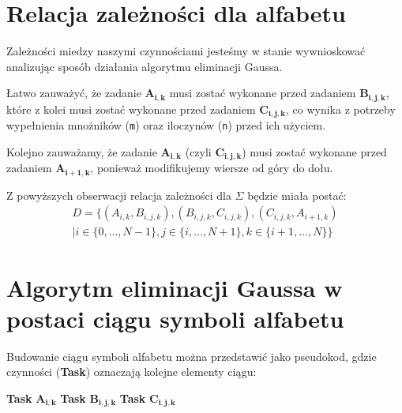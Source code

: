 \documentclass{article}
\begin{document}
\section{Relacja zależności dla alfabetu}
Zależności miedzy naszymi czynnościami jesteśmy w stanie wywnioskować analizując
sposób działania algorytmu eliminacji Gaussa.

Łatwo zauważyć, że zadanie $\mathbf{A_{i,k}}$ musi zostać wykonane przed zadaniem $\mathbf{B_{i,j,k}}$,
które z kolei musi zostać wykonane przed zadaniem $\mathbf{C_{i,j,k}}$, co wynika z potrzeby 
wypełnienia mnożników (\verb|m|) oraz iloczynów (\verb|n|) przed ich użyciem.

Kolejno zauważamy, że zadanie $\mathbf{A_{i,k}}$ (czyli $\mathbf{C_{i,j,k}}$) musi zostać wykonane przed 
zadaniem $\mathbf{A_{i+1,k}}$, ponieważ modifikujemy wiersze od góry do dołu.

\mbox{}\newline
Z powyższych obserwacji relacja zależności dla $\Sigma$ będzie miała postać:
\begin{multline}
    D = \{(A_{i,k}, B_{i,j,k}), (B_{i,j,k}, C_{i,j,k}), (C_{i,j,k}, A_{i+1,k}) \\
    \mid i \in \{0, \ldots, N-1\}, j \in \{i, \ldots, N+1\}, k \in \{i+1, \ldots, N\}\}
\end{multline}

\newpage

\section{Algorytm eliminacji Gaussa w postaci ciągu symboli alfabetu} \label{sec:pseudocode}
Budowanie ciągu symboli alfabetu można przedstawić jako pseudokod, gdzie 
czynności (\textbf{Task}) oznaczają kolejne elementy ciągu:
\begin{algorithmic}[1]
         
            \State \textbf{Task} $\mathbf{A_{i,k}}$
        \EndFor
         
                \State \textbf{Task} $\mathbf{B_{i,j,k}}$
            \EndFor
        \EndFor
         
                \State \textbf{Task} $\mathbf{C_{i,j,k}}$
            \EndFor
        \EndFor
    \EndFor
\end{algorithmic}

\newpage
\end{document}
